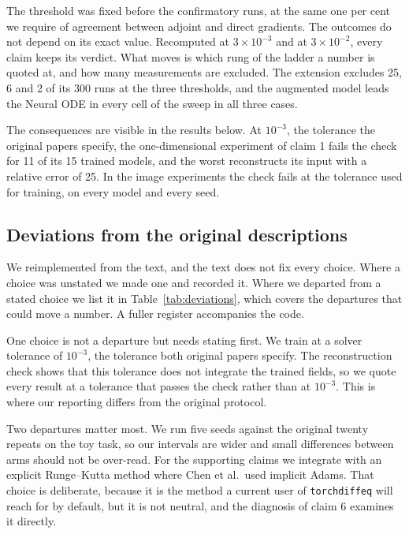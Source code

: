 The threshold was fixed before the confirmatory runs, at the same one per cent we require of
agreement between adjoint and direct gradients. The outcomes do not depend on its exact value.
Recomputed at $3\times10^{-3}$ and at $3\times10^{-2}$, every claim keeps its verdict. What
moves is which rung of the ladder a number is quoted at, and how many measurements are excluded.
The extension excludes 25, 6 and 2 of its 300 runs at the three thresholds, and the augmented
model leads the Neural ODE in every cell of the sweep in all three cases.

The consequences are visible in the results below. At $10^{-3}$, the tolerance the original
papers specify, the one-dimensional experiment of claim 1 fails the check for 11 of its 15
trained models, and the worst reconstructs its input with a relative error of 25. In the image experiments the
check fails at the tolerance used for training, on every model and every seed.

\subsection{Deviations from the original descriptions}
\label{sec:deviations}

We reimplemented from the text, and the text does not fix every choice. Where a choice was
unstated we made one and recorded it. Where we departed from a stated choice we list it in
Table~\ref{tab:deviations}, which covers the departures that could move a number. A fuller
register accompanies the code.

One choice is not a departure but needs stating first. We train at a solver tolerance of
$10^{-3}$, the tolerance both original papers specify. The reconstruction check shows that this
tolerance does not integrate the trained fields, so we quote every result at a tolerance that
passes the check rather than at $10^{-3}$. This is where our reporting differs from the
original protocol.

Two departures matter most. We run five seeds against the original twenty repeats on
the toy task, so our intervals are wider and small differences between arms should not be
over-read. For the supporting claims we integrate with an explicit Runge--Kutta method where
Chen et al.\ used implicit Adams. That choice is deliberate, because it is the method a
current user of \texttt{torchdiffeq} will reach for by default, but it is not neutral, and the diagnosis of claim 6 examines it directly.

